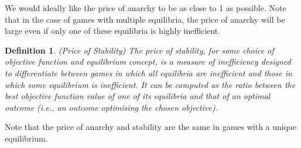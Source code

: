 \documentclass{article}
\newtheorem{definition}{Definition}
\begin{document}
We would ideally like the price of anarchy to be as close to 1 as possible. Note that in the case of games with multiple equilibria, the price of anarchy will be large even if only one of these equilibria is highly inefficient. 

\begin{definition}
(Price of Stability) The price of stability, for some choice of objective function and equilibrium concept, is a measure of inefficiency designed to differentiate between games in which all equilibria are inefficient and those in which some equilibrium is inefficient. It can be computed as the ratio between the best objective function value of one of its equilibria and that of an optimal outcome (i.e., an outcome optimising the chosen objective).
\end{definition}

Note that the price of anarchy and stability are the same in games with a unique equilibrium.



\end{document}
